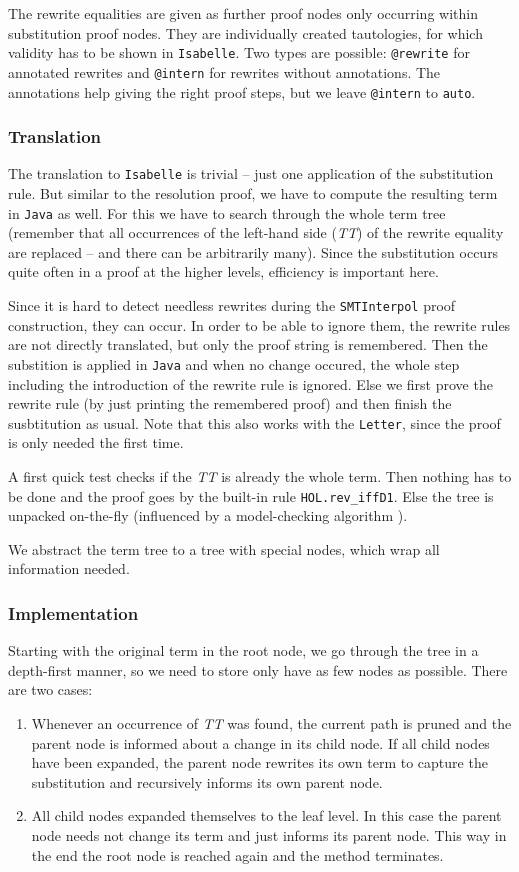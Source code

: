 \documentclass[10pt,a4paper]{article}
\newcommand{\si}{\texttt{SMTInterpol}\xspace}
\newcommand{\isa}{\texttt{Isabelle}\xspace}
\newcommand{\jav}{\texttt{Java}\xspace}
\newcommand{\ttt}{\texttt}
\newcommand{\TTx}{\emph{TT}}
\newcommand{\TT}{\TTx\xspace}
\begin{document}
The rewrite equalities are given as further proof nodes only occurring within substitution proof nodes. They are individually created tautologies, for which validity has to be shown in \isa. Two types are possible: \ttt{@rewrite} for annotated rewrites and \ttt{@intern} for rewrites without annotations. The annotations help giving the right proof steps, but we leave \ttt{@intern} to \ttt{auto}.
%
\subsubsection*{Translation}
The translation to \isa is trivial -- just one application of the substitution rule. But similar to the resolution proof, we have to compute the resulting term in \jav as well. For this we have to search through the whole term tree (remember that all occurrences of the left-hand side (\TT) of the rewrite equality are replaced -- and there can be arbitrarily many). Since the substitution occurs quite often in a proof at the higher levels, efficiency is important here.

Since it is hard to detect needless rewrites during the \si proof construction, they can occur. In order to be able to ignore them, the rewrite rules are not directly translated, but only the proof string is remembered. Then the substition is applied in \jav and when no change occured, the whole step including the introduction of the rewrite rule is ignored. Else we first prove the rewrite rule (by just printing the remembered proof) and then finish the susbtitution as usual. Note that this also works with the \ttt{Letter}, since the proof is only needed the first time.

A first quick test checks if the \TT is already the whole term. Then nothing has to be done and the proof goes by the built-in rule \ttt{HOL.rev\_iffD1}. Else the tree is unpacked on-the-fly (influenced by a model-checking algorithm \cite{gerth}).

We abstract the term tree to a tree with special nodes, which wrap all information needed.
%
\subsubsection*{Implementation}
Starting with the original term in the root node, we go through the tree in a depth-first manner, so we need to store only have as few nodes as possible. There are two cases:
%
\begin{enumerate}
	\item Whenever an occurrence of \TT was found, the current path is pruned and the parent node is informed about a change in its child node. If all child nodes have been expanded, the parent node rewrites its own term to capture the substitution and recursively informs its own parent node.
	\item All child nodes expanded themselves to the leaf level. In this case the parent node needs not change its term and just informs its parent node. This way in the end the root node is reached again and the method terminates.
\end{enumerate}
\end{document}
